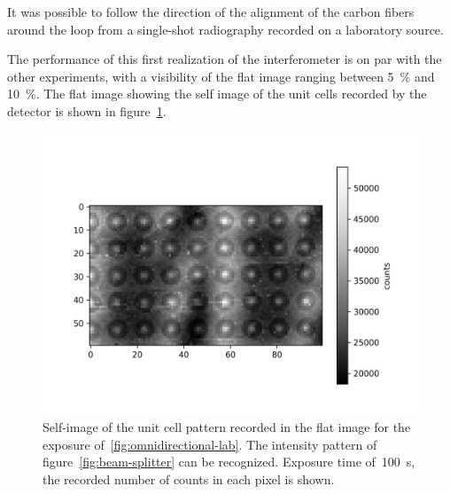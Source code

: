 It was possible to follow the direction of the alignment of the
carbon fibers around the loop from a single-shot radiography recorded on a
laboratory source.

The performance of this first realization of the interferometer is on par
with the other experiments, with a visibility of the flat image ranging
between \SI{5}{\percent} and \SI{10}{\percent}. The flat image showing the
self image of the unit cells recorded by the detector is shown in
figure~\ref{fig:cells}.

\begin{figure}[htb]
    \centering
    \includegraphics[width=\textwidth]{gfx/omnidirectional/visibility-omnidirectional.png}
    \caption{Self-image of the unit cell pattern recorded in the flat image
        for the exposure of~\ref{fig:omnidirectional-lab}. The intensity
        pattern of figure~\ref{fig:beam-splitter} can be recognized.
        Exposure time of~\SI{100}{\second}, the recorded number of counts in
    each pixel is shown.}
    \label{fig:cells}
\end{figure}
